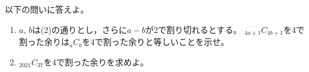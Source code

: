 \documentclass[../../main.tex]{subfiles}
\begin{document}
以下の問いに答えよ。
\begin{enumerate}
  $K$，$L$と正の整数$A$，$B$が$KA=LB$を満たしているとする。
    $K$を4で割った余りが$L$を4で割った余りと等しいならば，
    $A$を4で割った余りは$B$を4で割った余りと等しいことを示せ。
  $a, \, b$が$a>b$を満たしているとする。
    このとき，$A=_{4a+1}C_{4b+1}$，$B=_aC_b$に対して
    $KA=LB$となるような正の奇数$K$，$L$が存在することを示せ。
  \item$a, \, b$は(2)の通りとし，さらに$a-b$が2で割り切れるとする。
    $_{4a+1}C_{4b+1}$を4で割った余りは$_aC_b$を4で割った余りと等しいことを示せ。
  \item$_{2021}C_{37}$を4で割った余りを求めよ。
\end{enumerate}
\end{document}
